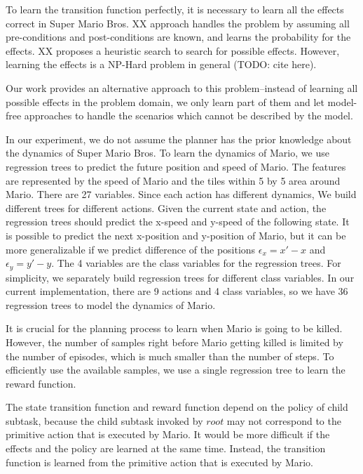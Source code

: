 To learn the transition function perfectly, it is necessary to 
learn all the effects correct in Super Mario Bros. 
XX approach handles the problem by assuming all pre-conditions and post-conditions are known,
and learns the probability for the effects. XX proposes a heuristic search 
to search for possible effects.
However,
learning the effects is a NP-Hard problem in general (TODO: cite here). 

Our work provides an alternative approach to this problem--instead of learning 
all possible effects in the problem domain, we only learn part of them and 
let model-free approaches to handle the scenarios which cannot be 
described by the model.


In our experiment, we do not assume the planner has the prior knowledge about 
the dynamics of Super Mario Bros. To learn the dynamics of Mario, we use regression trees
to predict the future position and speed of Mario. 
The features are represented by the speed of Mario and the tiles within 5 by 5 
area around Mario. There are 27 variables. 
Since each action has different dynamics, 
We build different trees for different actions. 
Given the current state and action, the regression trees should predict 
the x-speed and y-speed of the following state. It is possible to predict
the next x-position and y-position of Mario, but 
it can be more generalizable if we predict difference of the positions $\epsilon_x = x' - x$ and 
$\epsilon_y = y' - y$. The 4 variables are the class variables for the regression trees.
For simplicity, we separately build regression trees for different class variables. 
In our current implementation, there are 9 actions and 4 class variables, so we 
have 36 regression trees to model the dynamics of Mario. 

It is crucial for the planning process to learn when Mario is going to be killed. 
However, the number of samples right before Mario getting killed is limited by the
number of episodes, which is much smaller than the number of steps. 
To efficiently use the available samples, we use a single regression tree to learn the 
reward function.

The state transition function and reward function depend on the policy of 
child subtask, because the child subtask invoked by $root$ may not correspond to the primitive action that is executed by Mario.
It would be more difficult if the effects and the policy are learned at the same time. 
Instead, the transition function is learned from the primitive action that is executed by Mario.

